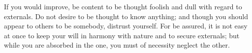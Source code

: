 If you would improve, be content to  be thought foolish and dull with regard to
externals. Do not desire to be thought  to know anything; and though you should
appear to others to  be somebody, distrust yourself. For be  assured, it is not
easy at once to keep your will  in harmony with nature and to secure externals;
but while you are absorbed in the one, you must of necessity neglect the other.
